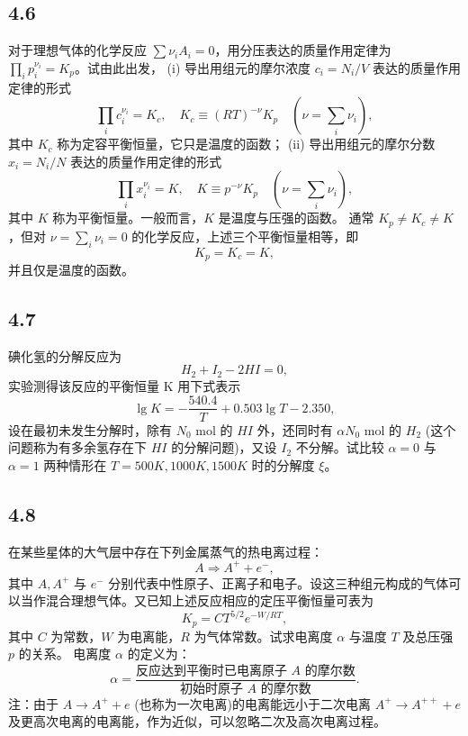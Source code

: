 \newpage
\subsection{4.6}
对于理想气体的化学反应 $\sum \nu_i A_i = 0$，用分压表达的质量作用定律为 $\prod_i p_i^{\nu_i} = K_p$。试由此出发，
(i) 导出用组元的摩尔浓度 $c_i = N_i / V$ 表达的质量作用定律的形式
$$\prod_i c_i^{\nu_i} = K_c, \quad K_c \equiv (RT)^{-\nu} K_p \quad (\nu = \sum_i \nu_i),$$
其中 $K_c$ 称为定容平衡恒量，它只是温度的函数；
(ii) 导出用组元的摩尔分数 $x_i = N_i / N$ 表达的质量作用定律的形式
$$\prod_i x_i^{\nu_i} = K, \quad K \equiv p^{-\nu}K_p \quad (\nu = \sum_i \nu_i),$$
其中 $K$ 称为平衡恒量。一般而言，$K$ 是温度与压强的函数。
通常 $K_p \neq K_c \neq K$，但对 $\nu = \sum_i \nu_i = 0$ 的化学反应，上述三个平衡恒量相等，即
$$K_p = K_c = K,$$
并且仅是温度的函数。

\newpage
\subsection{4.7}
碘化氢的分解反应为 $$H_2 + I_2 - 2HI = 0,$$ 实验测得该反应的平衡恒量 K 用下式表示 $$\lg K = -\frac{540.4}{T} + 0.503\lg T - 2.350,$$ 设在最初未发生分解时，除有 $N_0$ mol 的 $HI$ 外，还同时有 $\alpha N_0$ mol 的 $H_2$ (这个问题称为有多余氢存在下 $HI$ 的分解问题)，又设 $I_2$ 不分解。试比较 $\alpha = 0$ 与 $\alpha = 1$ 两种情形在 $T = 500K, 1000K, 1500K$ 时的分解度 $\xi$。

\newpage
\subsection{4.8}
在某些星体的大气层中存在下列金属蒸气的热电离过程：
$$A \Longrightarrow A^+ + e^- ,$$
其中 $A, A^+$ 与 $e^-$ 分别代表中性原子、正离子和电子。设这三种组元构成的气体可以当作混合理想气体。又已知上述反应相应的定压平衡恒量可表为
$$K_p = CT^{5/2}e^{-W/RT},$$
其中 $C$ 为常数，$W$ 为电离能，$R$ 为气体常数。试求电离度 $\alpha$ 与温度 $T$ 及总压强 $p$ 的关系。
电离度 $\alpha$ 的定义为：
$$\alpha = \frac{\text{反应达到平衡时已电离原子 } A \text{ 的摩尔数}}{\text{初始时原子 } A \text{ 的摩尔数}}.$$
注：由于 $A \longrightarrow A^+ + e$ (也称为一次电离)的电离能远小于二次电离 $A^+ \longrightarrow A^{++} + e$ 及更高次电离的电离能，作为近似，可以忽略二次及高次电离过程。

\newpage
